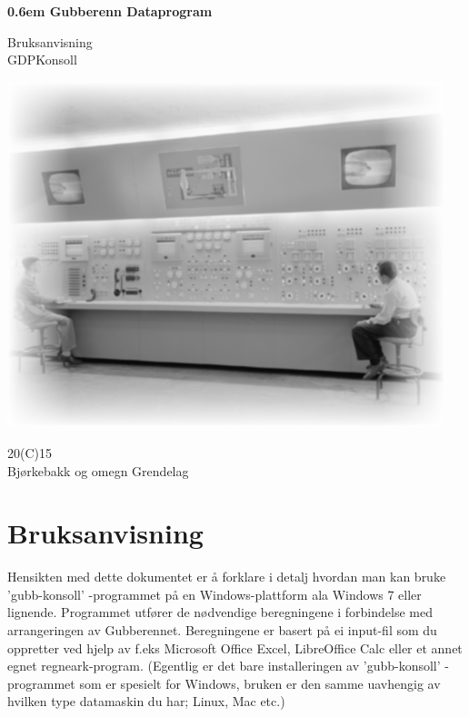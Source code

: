 \documentclass[12pt]{book}
\begin{document}
\rhead{\today}
\rfoot{\thepage}


\clearpage

\newcommand\nbvspace[1][3]{\vspace*{\stretch{#1}}}
\newcommand\nbstretchyspace{\spaceskip0.5em plus 0.25em minus 0.25em}
\newcommand{\nbtitlestretch}{\spaceskip0.6em}
\pagestyle{empty}
\begin{center}
\bfseries
\nbvspace[1]
\Huge
{\nbtitlestretch\huge
Gubberenn Dataprogram \\}

\nbvspace[10]
\normalsize

Bruksanvisning\\
GDPKonsoll\\

\nbvspace[2]

\includegraphics[width=5.0in]{gubb}
\nbvspace[15]
\normalsize

20(C)15\\
\large
Bjørkebakk og omegn Grendelag
\nbvspace[1]
\end{center}

\tableofcontents

\chapter{Bruksanvisning}

Hensikten med dette dokumentet er å forklare i detalj hvordan man kan bruke 'gubb-konsoll' -programmet på en Windows-plattform ala Windows 7 eller lignende. Programmet utfører de nødvendige beregningene i forbindelse med arrangeringen av Gubberennet. Beregningene er basert på ei input-fil som du oppretter ved hjelp av f.eks Microsoft Office Excel,  LibreOffice Calc eller et annet egnet regneark-program.  (Egentlig er det bare installeringen av 'gubb-konsoll' -programmet som er spesielt for Windows, bruken er den samme uavhengig av hvilken type datamaskin du har; Linux, Mac etc.)
\end{document}
